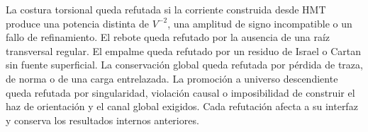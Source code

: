 \begin{falsifierbox}
La costura torsional queda refutada si la corriente construida desde HMT
produce una potencia distinta de \(V^{-2}\), una amplitud de signo
incompatible o un fallo de refinamiento. El rebote queda refutado por la
ausencia de una ra\'iz transversal regular. El empalme queda refutado por un
residuo de Israel o Cartan sin fuente superficial. La conservaci\'on global
queda refutada por p\'erdida de traza, de norma o de una carga entrelazada.
La promoci\'on a universo descendiente queda refutada por singularidad,
violaci\'on causal o imposibilidad de construir el haz de orientaci\'on y el
canal global exigidos. Cada refutaci\'on afecta a su interfaz y conserva los
resultados internos anteriores.
\end{falsifierbox}

